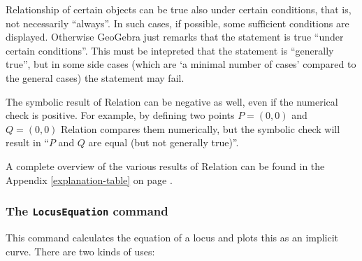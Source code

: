 \documentclass{article}
\begin{document}
Relationship of certain objects can be true also under certain conditions, that is, not necessarily ``always''. In such cases, if possible, some sufficient conditions are displayed. Otherwise GeoGebra just remarks that the statement is true ``under certain conditions''. This must be intepreted that the statement is ``generally true'', but in some side cases (which are `a minimal number of cases' compared to the general cases) the statement may fail.

The symbolic result of Relation can be negative as well, even if the numerical check is positive. For example, by defining two points $P=(0,0)$ and $Q=(0,0)$ Relation compares them numerically, but the symbolic check will result in ``$P$ and $Q$ are equal (but not generally true)''.

A complete overview of the various results of Relation can be found in the Appendix \ref{explanation-table} on page \pageref{explanation-table}.

\subsubsection{The \texttt{LocusEquation} command}

This command calculates the equation of a locus and plots this as an implicit curve. There are two kinds of uses:
\end{document}
